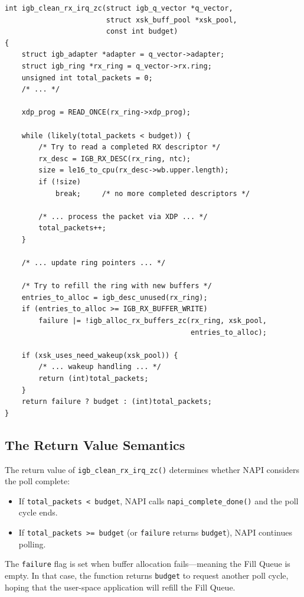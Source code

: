 \documentclass[11pt,a4paper,openany]{book}
\newcommand{\func}[1]{\texttt{#1()}}
\begin{document}
\begin{lstlisting}[caption={\texttt{igb\_clean\_rx\_irq\_zc()} (igb\_xsk.c:341), simplified},
    label=lst:clean-rx-zc]
int igb_clean_rx_irq_zc(struct igb_q_vector *q_vector,
                        struct xsk_buff_pool *xsk_pool,
                        const int budget)
{
    struct igb_adapter *adapter = q_vector->adapter;
    struct igb_ring *rx_ring = q_vector->rx.ring;
    unsigned int total_packets = 0;
    /* ... */

    xdp_prog = READ_ONCE(rx_ring->xdp_prog);

    while (likely(total_packets < budget)) {
        /* Try to read a completed RX descriptor */
        rx_desc = IGB_RX_DESC(rx_ring, ntc);
        size = le16_to_cpu(rx_desc->wb.upper.length);
        if (!size)
            break;     /* no more completed descriptors */

        /* ... process the packet via XDP ... */
        total_packets++;
    }

    /* ... update ring pointers ... */

    /* Try to refill the ring with new buffers */
    entries_to_alloc = igb_desc_unused(rx_ring);
    if (entries_to_alloc >= IGB_RX_BUFFER_WRITE)
        failure |= !igb_alloc_rx_buffers_zc(rx_ring, xsk_pool,
                                            entries_to_alloc);

    if (xsk_uses_need_wakeup(xsk_pool)) {
        /* ... wakeup handling ... */
        return (int)total_packets;
    }
    return failure ? budget : (int)total_packets;
}
\end{lstlisting}

\subsection{The Return Value Semantics}

The return value of \func{igb\_clean\_rx\_irq\_zc} determines
whether NAPI considers the poll complete:

\begin{itemize}
\item If \texttt{total\_packets < budget}, NAPI calls
    \func{napi\_complete\_done} and the poll cycle ends.
\item If \texttt{total\_packets >= budget} (or \texttt{failure}
    returns \texttt{budget}), NAPI continues polling.
\end{itemize}

The \texttt{failure} flag is set when buffer allocation fails---meaning
the Fill Queue is empty.  In that case, the function returns
\texttt{budget} to request another poll cycle, hoping that the user-space
application will refill the Fill Queue.
\end{document}
